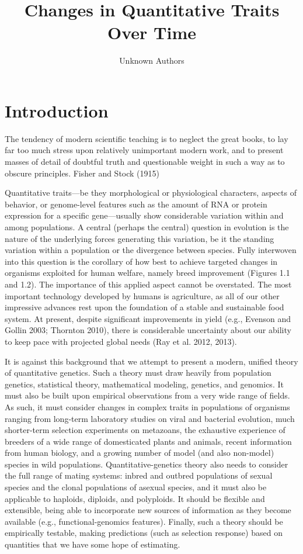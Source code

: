 \documentclass{article}
\title{Changes in Quantitative Traits Over Time}
\author{Unknown Authors}
\date{}
\begin{document}
\maketitle

\begin{abstract}

\end{abstract}

\section{Introduction}
The tendency of modern scientific teaching is to neglect the great books, to lay far too much stress upon relatively unimportant modern work, and to present masses of detail of doubtful truth and questionable weight in such a way as to obscure principles. Fisher and Stock (1915)

Quantitative traits—be they morphological or physiological characters, aspects of behavior, or genome-level features such as the amount of RNA or protein expression for a specific gene—usually show considerable variation within and among populations. A central (perhaps the central) question in evolution is the nature of the underlying forces generating this variation, be it the standing variation within a population or the divergence between species. Fully interwoven into this question is the corollary of how best to achieve targeted changes in organisms exploited for human welfare, namely breed improvement (Figures 1.1 and 1.2). The importance of this applied aspect cannot be overstated. The most important technology developed by humans is agriculture, as all of our other impressive advances rest upon the foundation of a stable and sustainable food system. At present, despite significant improvements in yield (e.g., Evenson and Gollin 2003; Thornton 2010), there is considerable uncertainty about our ability to keep pace with projected global needs (Ray et al. 2012, 2013).

It is against this background that we attempt to present a modern, unified theory of quantitative genetics. Such a theory must draw heavily from population genetics, statistical theory, mathematical modeling, genetics, and genomics. It must also be built upon empirical observations from a very wide range of fields. As such, it must consider changes in complex traits in populations of organisms ranging from long-term laboratory studies on viral and bacterial evolution, much shorter-term selection experiments on metazoans, the exhaustive experience of breeders of a wide range of domesticated plants and animals, recent information from human biology, and a growing number of model (and also non-model) species in wild populations. Quantitative-genetics theory also needs to consider the full range of mating systems: inbred and outbred populations of sexual species and the clonal populations of asexual species, and it must also be applicable to haploids, diploids, and polyploids. It should be flexible and extensible, being able to incorporate new sources of information as they become available (e.g., functional-genomics features). Finally, such a theory should be empirically testable, making predictions (such as selection response) based on quantities that we have some hope of estimating.
\end{document}
